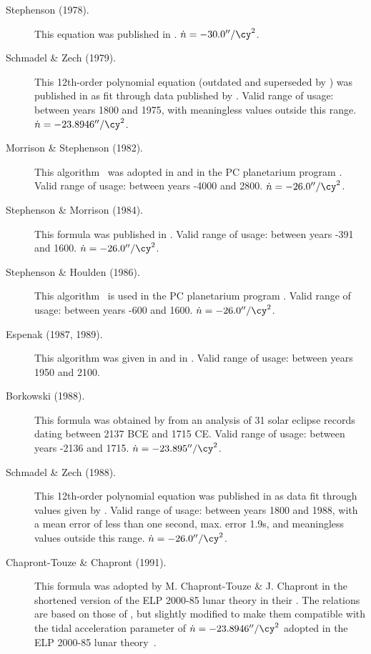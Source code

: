 \begin{description}
\item[Stephenson (1978).] This equation was published in
  . $\dot{n}=-30.0''/\cy^2$.

\item[Schmadel \& Zech (1979).] This 12th-order polynomial equation
  (outdated and superseded by \citet{1988AN....309..219S}) was published
  in  as fit through data published
  by \citet{1952AJ.....57..125B}. Valid range of usage: between
  years 1800 and 1975, with meaningless values outside this range. 
  $\dot{n}=-23.8946''/\cy^2$.

\item[Morrison \& Stephenson (1982).] This
  algorithm~\cite{1982ASSL...96..173M} was adopted in 
   and in the PC planetarium
  program . Valid range of usage: between years -4000 and
  2800. $\dot{n}=-26.0''/\cy^2$.

\item[Stephenson \& Morrison (1984).] This formula was published in 
  . Valid range of usage:
  between years -391 and 1600. $\dot{n}=-26.0''/\cy^2$.

\item[Stephenson \& Houlden (1986).] This
  algorithm~\citep{houlden1986supplement} is used in the PC planetarium
  program . Valid range of usage: between years -600 and
  1600.   $\dot{n}=-26.0''/\cy^2$.

\item[Espenak (1987, 1989).] This algorithm was given in 
   and in 
  . Valid range of
  usage: between years 1950 and 2100.

\item[Borkowski (1988).] This formula was obtained by
  \citet{1988A&A...205L...8B} from an analysis of 31
  solar eclipse records dating between 2137 BCE and 1715 CE. Valid
  range of usage: between years -2136 and 1715. $\dot{n}=-23.895''/\cy^2$.

\item[Schmadel \& Zech (1988).] This 12th-order polynomial equation
  was published in 
   as data fit through values
  given by \citet{1984RSPTA.313...47S}. Valid range of usage:
  between years 1800 and 1988, with a mean error of less than one
  second, max. error 1.9s, and meaningless values outside this
  range. $\dot{n}=-26.0''/\cy^2$.

\item[Chapront-Touze \& Chapront (1991).] This formula was adopted by
  M. Chapront-Touze \& J. Chapront in the shortened version of the ELP
  2000-85 lunar theory in their . The relations are
  based on those of \citet{1984RSPTA.313...47S}, but slightly
  modified to make them compatible with the tidal acceleration
  parameter of $\dot{n}=-23.8946''/\cy^2$ adopted in the ELP 2000-85 lunar
  theory~\citep{1988A&A...190..342C}.


\end{description}
